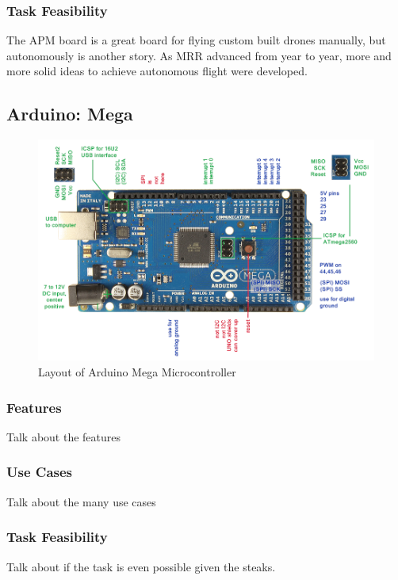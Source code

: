 \documentclass[conference,12pt, ]{IEEEtran}
\begin{document}
\subsubsection{Task Feasibility}
The APM board is a great board for flying custom built drones manually, but autonomously is another story. As MRR advanced from year to year, more and more solid ideas to achieve autonomous flight were developed.

\subsection{Arduino: Mega}
\begin{figure}
	\includegraphics[scale=0.25]{mega.png}
	\caption {Layout of Arduino Mega  Microcontroller}
\end{figure}
\subsubsection{Features}
Talk about the features
\subsubsection{Use Cases}
Talk about the many use cases
\subsubsection{Task Feasibility}
Talk about if the task is even possible given the steaks.
\end{document}
